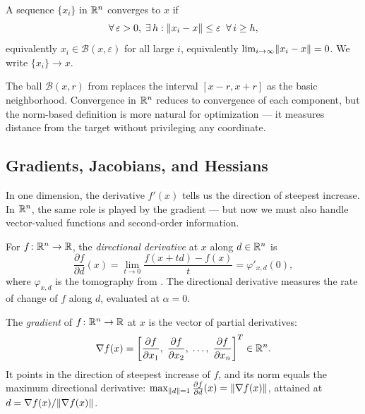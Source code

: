 \begin{defn}\label{def:convergence}
	A sequence $\{x_i\}$ in $\mathbb{R}^n$ converges to $x$ if
	\begin{equation}\label{eq:convergence}
		\forall\, \varepsilon > 0,\; \exists\, h : \lVert x_i - x\rVert \leq \varepsilon \;\;\forall\, i \geq h,
	\end{equation}
	equivalently $x_i \in \mathcal{B}(x, \varepsilon)$ for all large $i$, equivalently $\lim_{i \to \infty} \lVert x_i - x\rVert = 0$.
	We write $\{x_i\} \to x$.
\end{defn}

The ball $\mathcal{B}(x, r)$ from  replaces the interval $[x - r, x + r]$ as the basic neighborhood.
Convergence in $\mathbb{R}^n$ reduces to convergence of each component, but the norm-based definition is more natural for optimization --- it measures distance from the target without privileging any coordinate.


\subsection{Gradients, Jacobians, and Hessians}\label{ssec:grad-hess}

In one dimension, the derivative $f'(x)$ tells us the direction of steepest increase.
In $\mathbb{R}^n$, the same role is played by the gradient --- but now we must also handle vector-valued functions and second-order information.

\begin{defn}\label{def:dir-deriv}
	For $f \colon \mathbb{R}^n \to \mathbb{R}$, the \textit{directional derivative} at $x$ along $d \in \mathbb{R}^n$ is
	\begin{equation}\label{eq:directional-derivative}
		\frac{\partial f}{\partial d}(x)
		= \lim_{t \to 0} \frac{f(x + td) - f(x)}{t}
		= \varphi'_{x,d}(0),
	\end{equation}
	where $\varphi_{x,d}$ is the tomography from .
	The directional derivative measures the rate of change of $f$ along $d$, evaluated at $\alpha = 0$.
\end{defn}

\begin{defn}[Gradient]\label{def:gradient}
	The \textit{gradient} of $f \colon \mathbb{R}^n \to \mathbb{R}$ at $x$ is the vector of partial derivatives:
	\begin{equation}\label{eq:gradient}
		\nabla f(x)
		= \left[\frac{\partial f}{\partial x_1},\;
			\frac{\partial f}{\partial x_2},\;
			\dots,\;
			\frac{\partial f}{\partial x_n}\right]^T \in \mathbb{R}^n.
	\end{equation}
	It points in the direction of steepest increase of $f$, and its norm equals the maximum directional derivative: $\max_{\lVert d\rVert=1} \frac{\partial f}{\partial d}(x) = \lVert\nabla f(x)\rVert$, attained at $d = \nabla f(x) / \lVert\nabla f(x)\rVert$.
\end{defn}

